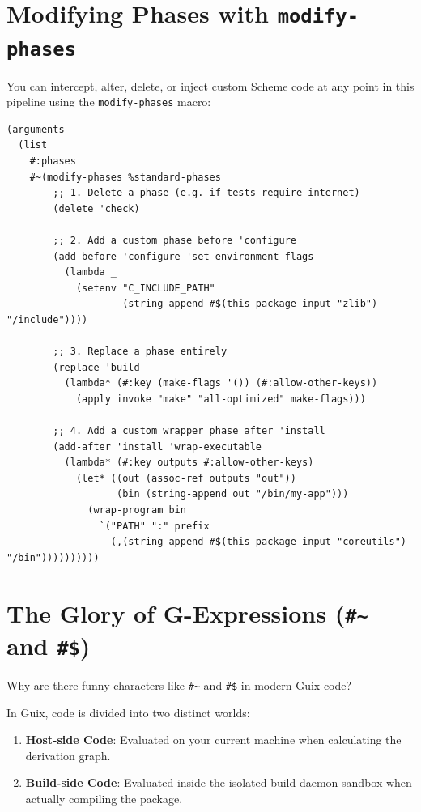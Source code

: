 \section{Modifying Phases with \texttt{modify-phases}}

You can intercept, alter, delete, or inject custom Scheme code at any point in this pipeline using the \texttt{modify-phases} macro:

\begin{lstlisting}[style=guixscheme]
(arguments
  (list
    #:phases
    #~(modify-phases %standard-phases
        ;; 1. Delete a phase (e.g. if tests require internet)
        (delete 'check)

        ;; 2. Add a custom phase before 'configure
        (add-before 'configure 'set-environment-flags
          (lambda _
            (setenv "C_INCLUDE_PATH"
                    (string-append #$(this-package-input "zlib") "/include"))))

        ;; 3. Replace a phase entirely
        (replace 'build
          (lambda* (#:key (make-flags '()) (#:allow-other-keys))
            (apply invoke "make" "all-optimized" make-flags)))

        ;; 4. Add a custom wrapper phase after 'install
        (add-after 'install 'wrap-executable
          (lambda* (#:key outputs #:allow-other-keys)
            (let* ((out (assoc-ref outputs "out"))
                   (bin (string-append out "/bin/my-app")))
              (wrap-program bin
                `("PATH" ":" prefix
                  (,(string-append #$(this-package-input "coreutils") "/bin"))))))))))
\end{lstlisting}

\section{The Glory of G-Expressions (\texttt{\#\~{}} and \texttt{\#\$})}

Why are there funny characters like \texttt{\#\~{}} and \texttt{\#\$} in modern Guix code?

In Guix, code is divided into two distinct worlds:
\begin{enumerate}
  \item \textbf{Host-side Code}: Evaluated on your current machine when calculating the derivation graph.
  \item \textbf{Build-side Code}: Evaluated inside the isolated build daemon sandbox when actually compiling the package.
\end{enumerate}

